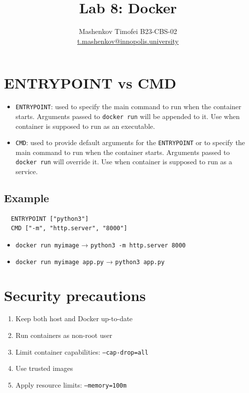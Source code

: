 \documentclass{article}
\title{Lab 8: Docker}
\author{Mashenkov Timofei B23-CBS-02 \\ \href{mailto:t.mashenkov@innopolis.university}{t.mashenkov@innopolis.university}}
\newcommand{\code}[1]{\colorbox{light-gray}{\texttt{#1}}}
\begin{document}
\maketitle{}

\section{ENTRYPOINT vs CMD}
\noindent

\begin{itemize}
  \item \code{ENTRYPOINT}: used to specify the main command to run when the container starts. Arguments passed to
    \code{docker run} will be appended to it. Use when container is supposed to run as an executable.
  \item \code{CMD}: used to provide default arguments for the \code{ENTRYPOINT} or to specify the main command to run
    when the container starts. Arguments passed to \code{docker run} will override it. Use when container is supposed to
    run as a service.
\end{itemize}

\subsection{Example}
\noindent

\begin{lstlisting}
  ENTRYPOINT ["python3"]
  CMD ["-m", "http.server", "8000"]
\end{lstlisting}

\begin{itemize}
  \item \code{docker run myimage} → \code{python3 -m http.server 8000}
  \item \code{docker run myimage app.py} → \code{python3 app.py}
\end{itemize}

\section{Security precautions}
\noindent

\begin{enumerate}
  \item Keep both host and Docker up-to-date
  \item Run containers as non-root user
  \item Limit container capabilities: \code{--cap-drop=all}
  \item Use trusted images
  \item Apply resource limits: \code{--memory=100m}
\end{enumerate}
\end{document}
